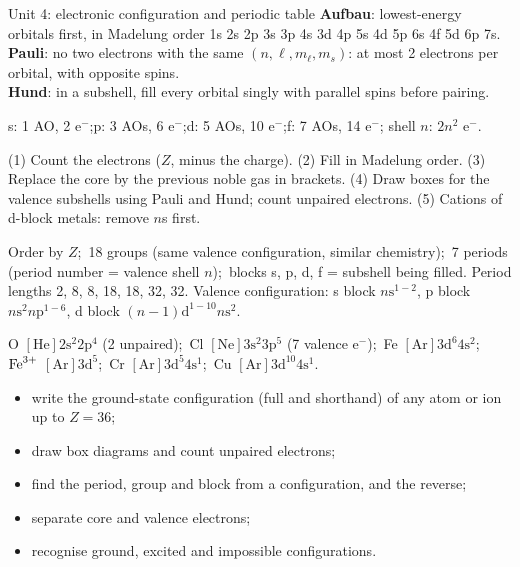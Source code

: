 \clearpage
\begin{recap}{Unit 4: electronic configuration and periodic table}
\textbf{Aufbau}: lowest-energy orbitals first, in Madelung order
1s 2s 2p 3s 3p 4s 3d 4p 5s 4d 5p 6s 4f 5d 6p 7s.\\
\textbf{Pauli}: no two electrons with the same $(n,\ell,m_\ell,m_s)$: at most 2 electrons per orbital,
with opposite spins.\\
\textbf{Hund}: in a subshell, fill every orbital singly with parallel spins before pairing.

s: 1 AO, 2 e$^-$;\quad p: 3 AOs, 6 e$^-$;\quad d: 5 AOs, 10 e$^-$;\quad f: 7 AOs, 14 e$^-$;\quad
shell $n$: $2n^2$ e$^-$.

(1) Count the electrons ($Z$, minus the charge). (2) Fill in Madelung order. (3) Replace the core by
the previous noble gas in brackets. (4) Draw boxes for the valence subshells using Pauli and Hund; count
unpaired electrons. (5) Cations of d-block metals: remove $n$s first.

Order by $Z$;\ 18 groups (same valence configuration, similar chemistry);\ 7 periods (period
number = valence shell $n$);\ blocks s, p, d, f = subshell being filled. Period lengths 2, 8, 8, 18,
18, 32, 32. Valence configuration: s block $n\mathrm s^{1-2}$, p block $n\mathrm s^2 n\mathrm p^{1-6}$,
d block $(n-1)\mathrm d^{1-10} n\mathrm s^{2}$.

O $[\mathrm{He}]2\mathrm s^2 2\mathrm p^4$ (2 unpaired);\ Cl $[\mathrm{Ne}]3\mathrm s^2 3\mathrm p^5$
(7 valence e$^-$);\ Fe $[\mathrm{Ar}]3\mathrm d^6 4\mathrm s^2$;\ $\ce{Fe^3+}$ $[\mathrm{Ar}]3\mathrm d^5$;\
Cr $[\mathrm{Ar}]3\mathrm d^5 4\mathrm s^1$;\ Cu $[\mathrm{Ar}]3\mathrm d^{10} 4\mathrm s^1$.

\begin{itemize}
  \item write the ground-state configuration (full and shorthand) of any atom or ion up to $Z = 36$;
  \item draw box diagrams and count unpaired electrons;
  \item find the period, group and block from a configuration, and the reverse;
  \item separate core and valence electrons;
  \item recognise ground, excited and impossible configurations.
\end{itemize}
\end{recap}
